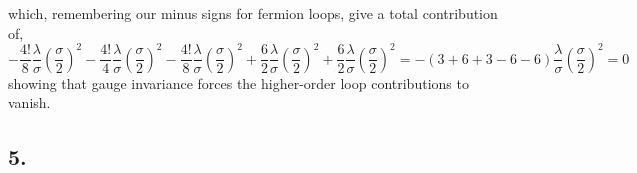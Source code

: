 \documentclass[12pt]{article}
\begin{document}
which, remembering our minus signs for fermion loops, give a total contribution of,
\[ -\frac{4!}{8} \frac{\lambda}{\sigma} \left( \frac{\sigma}{2} \right)^2 - \frac{4!}{4} \frac{\lambda}{\sigma} \left( \frac{\sigma}{2} \right)^2 - \frac{4!}{8} \frac{\lambda}{\sigma} \left( \frac{\sigma}{2} \right)^2 + \frac{6}{2} \frac{\lambda}{\sigma} \left( \frac{\sigma}{2} \right)^2 + \frac{6}{2} \frac{\lambda}{\sigma} \left( \frac{\sigma}{2} \right)^2 = - \left( 3 + 6 + 3 - 6 - 6 \right) \frac{\lambda}{\sigma} \left( \frac{\sigma}{2} \right)^2 = 0 \]
showing that gauge invariance forces the higher-order loop contributions to vanish. 

\subsection*{5.}
\end{document}
